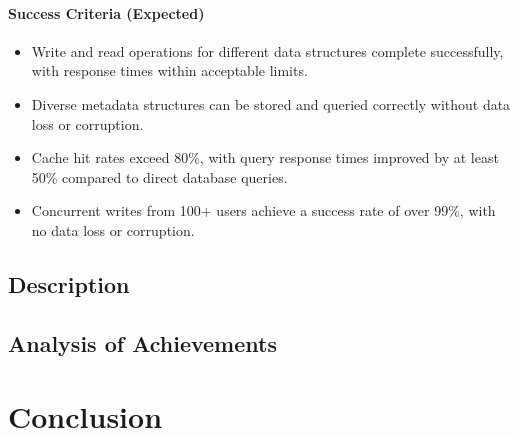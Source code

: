 \documentclass{article}
\begin{document}
\paragraph{Success Criteria (Expected)}
\begin{itemize}
    \item Write and read operations for different data structures complete successfully, with response times within acceptable limits.
    \item Diverse metadata structures can be stored and queried correctly without data loss or corruption.
    \item Cache hit rates exceed 80\%, with query response times improved by at least 50\% compared to direct database queries.
    \item Concurrent writes from 100+ users achieve a success rate of over 99\%, with no data loss or corruption.
\end{itemize}

\subsection{Description}

\subsection{Analysis of Achievements}

\section{Conclusion}
\end{document}
